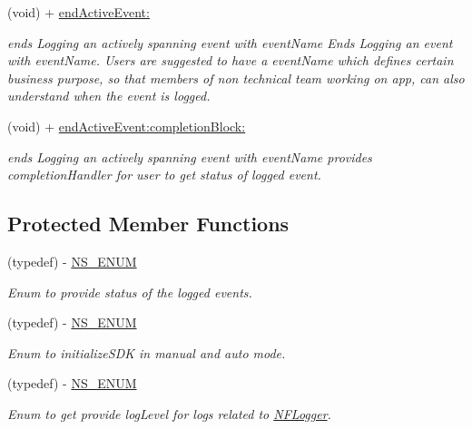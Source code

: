\begin{DoxyCompactItemize}
(void) + \hyperlink{interface_n_f_logger_a6cac38d011820ec21dc314c7a4d4aaf4}{end\+Active\+Event\+:}
\begin{DoxyCompactList}\small\item\em ends Logging an actively spanning event with event\+Name Ends Logging an event with event\+Name. Users are suggested to have a event\+Name which defines certain business purpose, so that members of non technical team working on app, can also understand when the event is logged. \end{DoxyCompactList}\item 
(void) + \hyperlink{interface_n_f_logger_a72b51800e587c99090a5b8ce8788fa14}{end\+Active\+Event\+:completion\+Block\+:}
\begin{DoxyCompactList}\small\item\em ends Logging an actively spanning event with event\+Name provides completion\+Handler for user to get status of logged event. \end{DoxyCompactList}\end{DoxyCompactItemize}
\subsection*{Protected Member Functions}
\begin{DoxyCompactItemize}
\item 
(typedef) -\/ \hyperlink{interface_n_f_logger_ab785af89c63637bf04e29bebc0d781de}{N\+S\+\_\+\+E\+N\+UM}
\begin{DoxyCompactList}\small\item\em Enum to provide status of the logged events. \end{DoxyCompactList}\item 
(typedef) -\/ \hyperlink{interface_n_f_logger_ae7d5d1604436c440bd209346ff72e85f}{N\+S\+\_\+\+E\+N\+UM}
\begin{DoxyCompactList}\small\item\em Enum to initialize\+S\+DK in manual and auto mode. \end{DoxyCompactList}\item 
(typedef) -\/ \hyperlink{interface_n_f_logger_aa59e1d712c8479701815743004967132}{N\+S\+\_\+\+E\+N\+UM}
\begin{DoxyCompactList}\small\item\em Enum to get provide log\+Level for logs related to \hyperlink{interface_n_f_logger}{N\+F\+Logger}. \end{DoxyCompactList}\end{DoxyCompactItemize}


